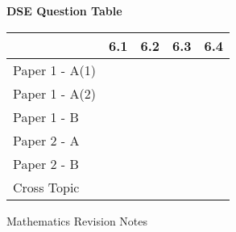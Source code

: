\documentclass[12pt, a4paper]{article}
\begin{document}
\begin{absolutelynopagebreak}
\begin{center}
\textbf{DSE Question Table}
\end{center}
\begin{center}
\begin{tabular}{|l|c|c|c|c|}
\hline
        & 6.1 & 6.2 & 6.3 & 6.4 \\\hline
\hline
Paper 1 - A(1)&  &  &  &  \\
\hline
Paper 1 - A(2)&  &  &  &  \\
\hline
Paper 1 - B&  &  &  &  \\
\hline
\hline
Paper 2 - A&  &  &  &  \\
\hline
Paper 2 - B&  &  &  &  \\
\hline
\hline
Cross Topic&  &  &  &  \\
\hline
\end{tabular}
\end{center}
\end{absolutelynopagebreak}
\newpage
\newpage
\thispagestyle{empty}
\begin{center}
Mathematics Revision Notes\\\vspace{1cm}
\\\vspace{1cm}
{\fontsize{24pt}{24pt}\selectfont {Symmetry and Transformation}} \\\vspace{1cm}
\label{chapter:S1-7}

\end{center}
\vspace{0.5cm}
\hline
\end{document}
